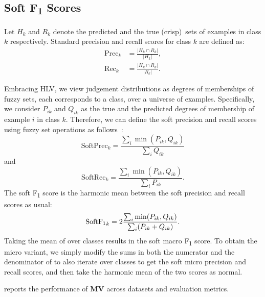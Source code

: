 \documentclass[shortpaper]{clv2025}
\newcommand{\methname}[1]{\textbf{#1}}  %
\begin{document}
\subsection{Soft F\textsubscript{1} Scores}

Let $H_k$ and $R_k$ denote the predicted and the true (crisp)~sets of examples
in class $k$ respectively. Standard precision and recall scores for class $k$
are defined as:
\begin{align*}
  \mathrm{Prec}_k&=\frac{|H_k\cap R_k|}{|H_k|},\\
  \mathrm{Rec}_k&=\frac{|H_k\cap R_k|}{|R_k|}.
\end{align*}

Embracing HLV, we view judgement distributions as degrees of memberships of fuzzy
sets, each corresponds to a class, over a universe of examples. Specifically, we
consider $P_{ik}$ and $Q_{ik}$ as the true and the predicted degrees of
membership of example $i$ in class $k$. Therefore, we can define the soft
precision and recall scores using fuzzy set operations as
follows~\citep{harju2023}:
\begin{equation}
  \mathrm{SoftPrec}_k=\frac{\sum_i\min(P_{ik},Q_{ik})}{\sum_iQ_{ik}}\label{eqn:cw-soft-p}
\end{equation}
and
\begin{equation}
  \mathrm{SoftRec}_k=\frac{\sum_i\min(P_{ik},Q_{ik})}{\sum_iP_{ik}}.\label{eqn:cw-soft-r}
\end{equation}
The soft F\textsubscript{1} score is the harmonic mean between the soft
precision and recall scores as usual:
\begin{equation}
  \mathrm{SoftF\textsubscript{1}}_k=2\frac{\sum_i\min(P_{ik},Q_{ik})}{\sum_i(P_{ik}+Q_{ik})}.\label{eqn:cw-soft-f1}
\end{equation}
Taking the mean of  over classes results in the soft macro
F\textsubscript{1} score. To obtain the micro variant, we simply modify the sums
in both the numerator and the denominator of 
to also iterate over classes to get the soft micro precision and recall scores,
and then take the harmonic mean of the two scores as normal.

\appendixsection{Performance of \methname{MV}}

 reports the performance of \methname{MV} across datasets
and evaluation metrics.
\end{document}
